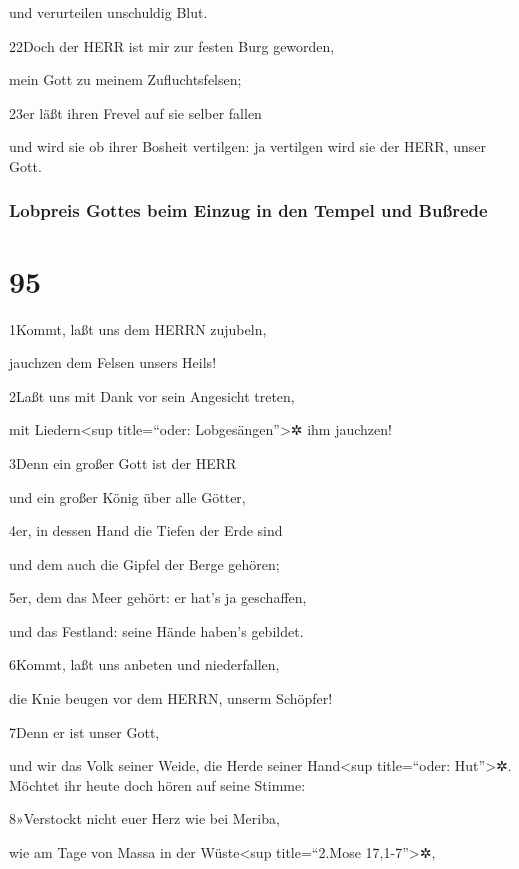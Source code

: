 und verurteilen unschuldig Blut.

22Doch der HERR ist mir zur festen Burg geworden,

mein Gott zu meinem Zufluchtsfelsen;

23er läßt ihren Frevel auf sie selber fallen

und wird sie ob ihrer Bosheit vertilgen: ja vertilgen wird sie der HERR,
unser Gott.

\hypertarget{lobpreis-gottes-beim-einzug-in-den-tempel-und-buuxdfrede}{%
\subsubsection{Lobpreis Gottes beim Einzug in den Tempel und
Bußrede}\label{lobpreis-gottes-beim-einzug-in-den-tempel-und-buuxdfrede}}

\hypertarget{section-94}{%
\section{95}\label{section-94}}

1Kommt, laßt uns dem HERRN zujubeln,

jauchzen dem Felsen unsers Heils!

2Laßt uns mit Dank vor sein Angesicht treten,

mit Liedern\textless sup title=``oder: Lobgesängen''\textgreater✲ ihm
jauchzen!

3Denn ein großer Gott ist der HERR

und ein großer König über alle Götter,

4er, in dessen Hand die Tiefen der Erde sind

und dem auch die Gipfel der Berge gehören;

5er, dem das Meer gehört: er hat's ja geschaffen,

und das Festland: seine Hände haben's gebildet.

6Kommt, laßt uns anbeten und niederfallen,

die Knie beugen vor dem HERRN, unserm Schöpfer!

7Denn er ist unser Gott,

und wir das Volk seiner Weide, die Herde seiner Hand\textless sup
title=``oder: Hut''\textgreater✲. Möchtet ihr heute doch hören auf seine
Stimme:

8»Verstockt nicht euer Herz wie bei Meriba,

wie am Tage von Massa in der Wüste\textless sup title=``2.Mose
17,1-7''\textgreater✲,


